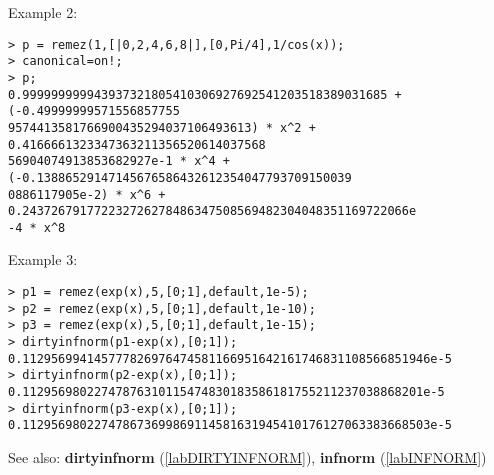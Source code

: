 \noindent Example 2: 
\begin{center}\begin{minipage}{15cm}\begin{Verbatim}[frame=single]
> p = remez(1,[|0,2,4,6,8|],[0,Pi/4],1/cos(x));
> canonical=on!;
> p;
0.999999999943937321805410306927692541203518389031685 + (-0.49999999571556857755
9574413581766900435294037106493613) * x^2 + 0.4166661323347363211356520614037568
56904074913853682927e-1 * x^4 + (-0.13886529147145676586432612354047793709150039
0886117905e-2) * x^6 + 0.243726791772232726278486347508569482304048351169722066e
-4 * x^8
\end{Verbatim}
\end{minipage}\end{center}
\noindent Example 3: 
\begin{center}\begin{minipage}{15cm}\begin{Verbatim}[frame=single]
> p1 = remez(exp(x),5,[0;1],default,1e-5);
> p2 = remez(exp(x),5,[0;1],default,1e-10);
> p3 = remez(exp(x),5,[0;1],default,1e-15);
> dirtyinfnorm(p1-exp(x),[0;1]);
0.112956994145777826976474581166951642161746831108566851946e-5
> dirtyinfnorm(p2-exp(x),[0;1]);
0.11295698022747876310115474830183586181755211237038868201e-5
> dirtyinfnorm(p3-exp(x),[0;1]);
0.112956980227478673699869114581631945410176127063383668503e-5
\end{Verbatim}
\end{minipage}\end{center}
See also: \textbf{dirtyinfnorm} (\ref{labDIRTYINFNORM}), \textbf{infnorm} (\ref{labINFNORM})
